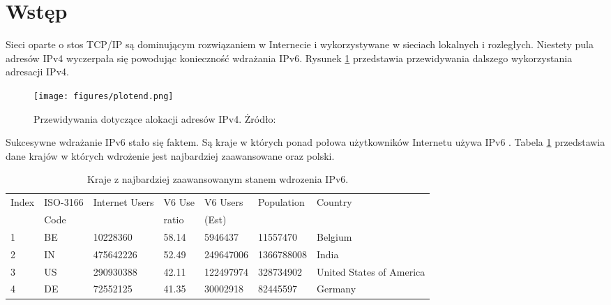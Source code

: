 ﻿\chapter*{Wstęp}

Sieci oparte o stos TCP/IP są dominującym rozwiązaniem w Internecie i wykorzystywane w sieciach lokalnych i rozległych. Niestety pula adresów IPv4 wyczerpała się \cite{www-1} powodując konieczność wdrażania IPv6. Rysunek \ref{fig:plotend} przedstawia przewidywania dalszego wykorzystania adresacji IPv4.

\begin{figure}[!ht]
	\centering
		\texttt{[image: figures/plotend.png]}
	\caption{\footnotesize Przewidywania dotyczące alokacji adresów IPv4. Żródło: \cite{www-1}}
	\label{fig:plotend}
\end{figure}

Sukcesywne wdrażanie IPv6 stało się faktem. Są kraje w których ponad połowa użytkowników Internetu używa IPv6 \cite{www-2}. Tabela \ref{tab:KrajeZ} przedstawia dane krajów w których wdrożenie jest najbardziej zaawansowane oraz polski.

\begin{table}[!ht]
	\caption{\footnotesize Kraje z najbardziej zaawansowanym stanem wdrozenia IPv6.}
		\begin{center}
			\begin{small}
				\begin{tabular}{|l|l|l|l|l|l|l|}
					\hline
					Index&ISO-3166 &Internet Users&V6 Use &V6 Users &Population&Country \\
							 & Code &                 & ratio & (Est) &   & \\
					\hline
					1&BE&10228360&58.14&5946437&11557470&Belgium \\
					2&IN&475642226&52.49&249647006&1366788008&India \\
					3&US&290930388&42.11&122497974&328734902&United States of America \\ 
					4&DE&72552125&41.35&30002918&82445597&Germany \\
					\hline
				
				\end{tabular}
			\end{small}
			\end{center}
	\label{tab:KrajeZ}
\end{table}
